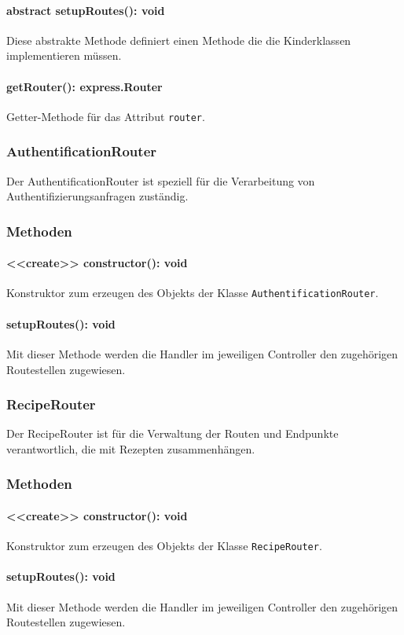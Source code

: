 \documentclass[parskip=full]{scrartcl}
\begin{document}
\paragraph{abstract setupRoutes(): void}Diese abstrakte Methode definiert einen Methode die die Kinderklassen implementieren müssen.
\paragraph{getRouter(): express.Router}Getter-Methode für das Attribut \texttt{router}.


\subsubsection{AuthentificationRouter}
Der AuthentificationRouter ist speziell für die Verarbeitung von Authentifizierungsanfragen zuständig. 
\subsubsection*{Methoden}
\paragraph{<<create>> constructor(): void}Konstruktor zum erzeugen des Objekts der Klasse \newline
\texttt{AuthentificationRouter}.
\paragraph{setupRoutes(): void}Mit dieser Methode werden die Handler im jeweiligen Controller den zugehörigen Routestellen zugewiesen.

\subsubsection{RecipeRouter}
Der RecipeRouter ist für die Verwaltung der Routen und Endpunkte verantwortlich, die mit Rezepten zusammenhängen.
\subsubsection*{Methoden}
\paragraph{<<create>> constructor(): void}Konstruktor zum erzeugen des Objekts der Klasse \newline
\texttt{RecipeRouter}.
\paragraph{setupRoutes(): void}Mit dieser Methode werden die Handler im jeweiligen Controller den zugehörigen Routestellen zugewiesen.
\end{document}
